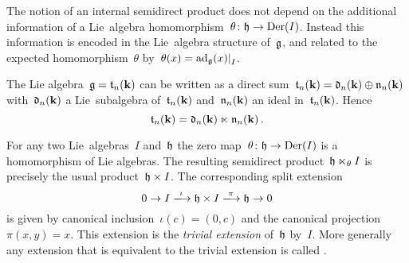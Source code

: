 \begin{remark}
  The notion of an internal semidirect product does not depend on the additional information of a Lie~algebra homomorphism~$\theta \colon \mathfrak{h} \to \operatorname{Der}(I)$.
  Instead this information is encoded in the Lie~algebra structure of~$\mathfrak{g}$, and related to the expected homomorphism~$\theta$ by~$\theta(x) = \restrict{\ad_{\glie}(x)}{I}$.
\end{remark}


\begin{example}
  The Lie algebra~$\mathfrak{g} = \mathfrak{t}_n(\mathbf{k})$ can be written as a direct sum~$\mathfrak{t}_n(\mathbf{k}) = \mathfrak{d}_n(\mathbf{k}) \oplus \mathfrak{n}_n(\mathbf{k})$ with~$\mathfrak{d}_n(\mathbf{k})$ a Lie~subalgebra of~$\mathfrak{t}_n(\mathbf{k})$ and~$\mathfrak{n}_n(\mathbf{k})$ an ideal in~$\mathfrak{t}_n(\mathbf{k})$.
  Hence
  \[
    \mathfrak{t}_n(\mathbf{k})
    =
    \mathfrak{d}_n(\mathbf{k}) \ltimes \mathfrak{n}_n(\mathbf{k}) \,.
  \]
\end{example}


\begin{example}
  \label{trivial extension is semidirect}
  For any two Lie~algebras~$I$ and~$\mathfrak{h}$ the zero map~$\theta \colon \mathfrak{h} \to \operatorname{Der}(I)$ is a homomorphism of Lie algebras.
  The resulting semidirect product~$\mathfrak{h} \ltimes_\theta I$ is precisely the usual product~$\mathfrak{h} \times I$.
  The corresponding split extension
  \[
    0
    \to
    I
    \xlongto{\iota}
    \hlie \times I
    \xlongto{\pi}
    \hlie
    \to
    0
  \]
  is given by canonical inclusion~$\iota(c) = (0,c)$ and the canonical projection~$\pi(x,y) = x$.
  This extension is the \emph{trivial extension} of~$\mathfrak{h}$ by~$I$.
  More generally any extension that is equivalent to the trivial extension is called .
\end{example}


%   
% 


